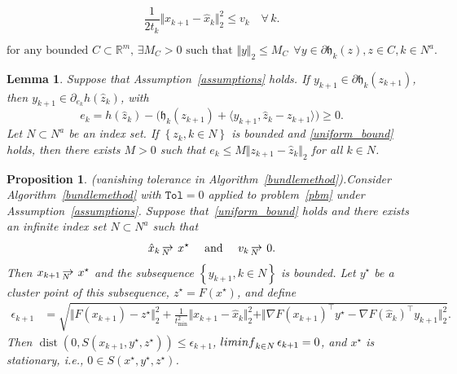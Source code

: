 \documentclass[10pt,a4paper]{amsart}
\newtheorem{lemma}{Lemma}
\newtheorem{proposition}{Proposition}
\def\Nto{\,{\raise 1pt\hbox{$\rightarrow$}}\kern -12pt
     \hbox{\lower 3pt \hbox{$\, \scriptstyle N$}}\hskip7pt}
\renewcommand{\Re}{\mathbb{R}}
\newcommand{\col}[1]{\left\{#1\right\}}
\DeclareMathOperator{\dist}{dist}
\newcommand{\inner}[2]{\langle#1,#2\rangle}
\newcommand{\modelh}{\mathfrak{h}}
\newcommand{\nliminf}{\mathop{\rm liminf}\nolimits}
\newcommand{\norm}[1]{\textstyle{\Vert} #1 \textstyle{\Vert}_2}
\newcommand{\tol}{\texttt{Tol}}
\begin{document}
\begin{equation}\label{vk}
\frac{1}{2t_k}\norm{x_{k+1}-\hat x_k}^2 \leq  v_k \quad \forall\, k.
\end{equation}

\begin{equation}\label{uniform_bound}
    \mbox{for any bounded $C \subset \Re^m$, $\exists M_C>0$ such that } \norm{y}\leq M_C ~~\forall y\in \partial \modelh_k(z), z\in C, k \in N^a.
\end{equation}

\begin{lemma}\label{lem:approx-sub} Suppose that Assumption~\ref{assumptions} holds. If $y_{k+1}\in \partial \modelh_k(z_{k+1})$, then $y_{k+1}\in \partial_{e_k} h(\hat z_{k})$, with 
\[
e_k = h(\hat z_{k}) - \big(\modelh_k(z_{k+1}) + \inner{y_{k+1}}{\hat z_k - z_{k+1}}\big) \geq 0.
\]
Let $N\subset N^a$ be an index set. If $\col{z_k,k \in N}$ is bounded and \eqref{uniform_bound} holds, then there exists $M>0$ such that $e_k\leq M\norm{z_{k+1}-\hat z_k}$ for all $k\in N$.
\end{lemma}

\begin{proposition}{\rm (vanishing tolerance in Algorithm~\ref{bundlemethod}).}\label{prop:vk}
Consider Algorithm~\ref{bundlemethod} with $\tol=0$ applied to problem~\eqref{pbm} under Assumption~\ref{assumptions}.
Suppose that~\eqref{uniform_bound} holds and there exists an infinite index set $N \subset N^a$ such that
\[
\hat x_{k} \Nto  x^\star \quad \text{ and } \quad  v_k \Nto 0.
\]
Then $x_{k+1} \Nto x^\star$ and the subsequence $\col{y_{k+1}, k\in N}$ is bounded. 
Let $y^\star$ be a cluster point of this subsequence, $z^\star= F( x^\star)$,  and define
  \begin{align*}
\epsilon_{k+1}
&=\sqrt{\norm{F(x_{k+1})-z^\star}^2 +\frac{1}{t_{\min}^2}\norm{x_{k+1}-\hat x_k}^2  + \norm{\nabla F(x_{k+1})^\top y^\star - \nabla F(\hat x_{k})^\top  y_{k+1} }^2}.
\end{align*}
Then $\dist(0,S(x_{k+1},y^\star,z^\star)) \leq {\epsilon_{k+1}}$,
$\nliminf_{k\in N} \epsilon_{k+1}=0$, and $x^\star $ is stationary, i.e., $0\in S(x^\star, y^\star,  z^\star)$. 
\end{proposition}
\end{document}
